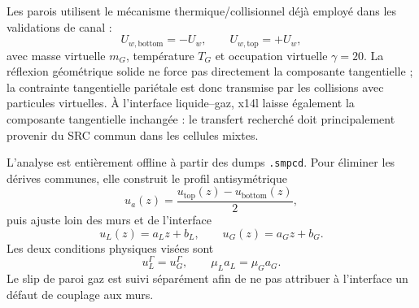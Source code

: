 \documentclass[11pt,a4paper]{article}
\begin{document}
Les parois utilisent le mécanisme thermique/collisionnel déjà employé dans les validations de canal :
\begin{equation}
  U_{w,\mathrm{bottom}}=-U_w,
  \qquad
  U_{w,\mathrm{top}}=+U_w,
\end{equation}
avec masse virtuelle $m_G$, température $T_G$ et occupation virtuelle $\gamma=20$. La réflexion géométrique solide ne force pas directement la composante tangentielle ; la contrainte tangentielle pariétale est donc transmise par les collisions avec particules virtuelles. À l'interface liquide--gaz, x14l laisse également la composante tangentielle inchangée : le transfert recherché doit principalement provenir du SRC commun dans les cellules mixtes.

L'analyse est entièrement offline à partir des dumps \texttt{.smpcd}. Pour éliminer les dérives communes, elle construit le profil antisymétrique
\begin{equation}
  u_a(z)=\frac{u_{\mathrm{top}}(z)-u_{\mathrm{bottom}}(z)}{2},
\end{equation}
puis ajuste loin des murs et de l'interface
\begin{equation}
  u_L(z)=a_Lz+b_L,
  \qquad
  u_G(z)=a_Gz+b_G.
\end{equation}
Les deux conditions physiques visées sont
\begin{equation}
  u_L^\Gamma=u_G^\Gamma,
  \qquad
  \mu_L a_L=\mu_G a_G.
  \label{eq:x14-couette-targets}
\end{equation}
Le slip de paroi gaz est suivi séparément afin de ne pas attribuer à l'interface un défaut de couplage aux murs.
\end{document}
